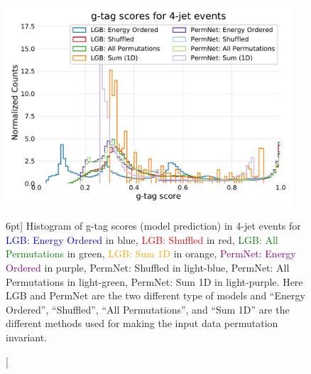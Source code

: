\documentclass[a4paper, twoside]{tufte-book}
\newcommand{\q}[1]{``#1''}
\begin{document}
\begin{figure}
  \includegraphics[width=0.95\textwidth, trim=10 10 10 40, clip]{figures/quarks/gtag_y_pred_4_jet_hist-down_sample=1.00-ML_vars=vertex-selection=b-ejet_min=4-n_iter_RS_lgb=99-n_iter_RS_xgb=9-cdot_cut=0.90-version=19.pdf}
  \caption[g-tag scores in 4-jet events][6pt]
          {
            Histogram of g-tag scores (model prediction) in 4-jet events for \textcolor{blue}{LGB: Energy Ordered} in blue, \textcolor{red}{LGB: Shuffled} in red, \textcolor{green}{LGB: All Permutations} in green, \textcolor{orange}{LGB: Sum 1D} in orange, \textcolor{purple}{PermNet: Energy Ordered} in purple, \textcolor{light-blue}{PermNet: Shuffled} in light-blue, \textcolor{light-green}{PermNet: All Permutations} in light-green, \textcolor{light-purple}{PermNet: Sum 1D} in light-purple.  Here LGB and PermNet are the two different type of models and \q{Energy Ordered}, \q{Shuffled}, \q{All Permutations}, and \q{Sum 1D} are the different methods used for making the input data permutation invariant.  
          }   
  \label{fig:q:gtag_scores_4j}
\end{figure}
\end{document}
